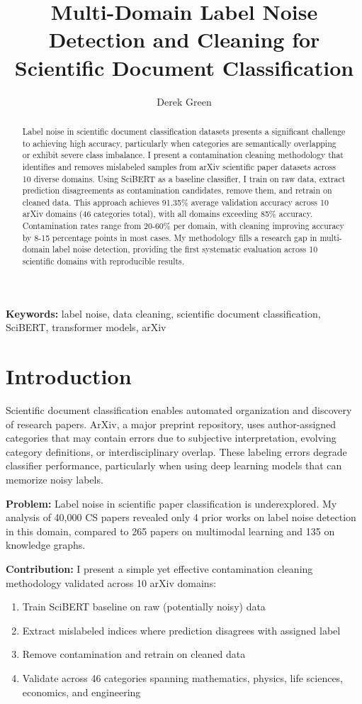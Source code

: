 \documentclass{article}
\title{Multi-Domain Label Noise Detection and Cleaning for Scientific Document Classification}
\author{Derek Green}
\date{}
\begin{document}
\maketitle

\begin{abstract}
Label noise in scientific document classification datasets presents a significant challenge to achieving high accuracy, particularly when categories are semantically overlapping or exhibit severe class imbalance. I present a contamination cleaning methodology that identifies and removes mislabeled samples from arXiv scientific paper datasets across 10 diverse domains. Using SciBERT as a baseline classifier, I train on raw data, extract prediction disagreements as contamination candidates, remove them, and retrain on cleaned data. This approach achieves 91.35\% average validation accuracy across 10 arXiv domains (46 categories total), with all domains exceeding 85\% accuracy. Contamination rates range from 20-60\% per domain, with cleaning improving accuracy by 8-15 percentage points in most cases. My methodology fills a research gap in multi-domain label noise detection, providing the first systematic evaluation across 10 scientific domains with reproducible results.
\end{abstract}

\textbf{Keywords:} label noise, data cleaning, scientific document classification, SciBERT, transformer models, arXiv

\section{Introduction}

Scientific document classification enables automated organization and discovery of research papers. ArXiv, a major preprint repository, uses author-assigned categories that may contain errors due to subjective interpretation, evolving category definitions, or interdisciplinary overlap. These labeling errors degrade classifier performance, particularly when using deep learning models that can memorize noisy labels.

\textbf{Problem:} Label noise in scientific paper classification is underexplored. My analysis of 40,000 CS papers revealed only 4 prior works on label noise detection in this domain, compared to 265 papers on multimodal learning and 135 on knowledge graphs.

\textbf{Contribution:} I present a simple yet effective contamination cleaning methodology validated across 10 arXiv domains:
\begin{enumerate}
    \item Train SciBERT baseline on raw (potentially noisy) data
    \item Extract mislabeled indices where prediction disagrees with assigned label
    \item Remove contamination and retrain on cleaned data
    \item Validate across 46 categories spanning mathematics, physics, life sciences, economics, and engineering
\end{enumerate}
\end{document}
